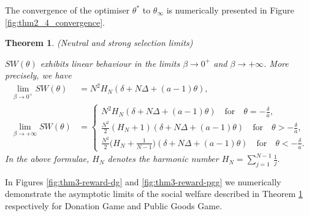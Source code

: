 \documentclass{article}
\newtheorem{theorem}{Theorem}
\begin{document}
The convergence of the optimiser $\theta^*$ to $\theta_\infty$ is numerically presented in Figure \ref{fig:thm2_4_convergence}.\\


\begin{theorem}(Neutral and strong selection limits) \label{thm: selection-limits}

$SW(\theta)$ exhibits linear behaviour in the limits $\beta \to 0^+$ and $\beta \to +\infty$. More precisely, we have
\begin{align*}
\lim_{\beta\to 0^+} SW(\theta)&=N^2 H_N (\delta+N\Delta+(a-1)\theta),\\
\lim_{\beta \to +\infty}SW(\theta)&=\begin{cases}
      N^2 H_N (\delta+N\Delta+(a-1)\theta)\quad\text{for}\quad \theta=-\frac{\delta}{a},\\
      \frac{N^2}{2}(H_N+1)(\delta+N\Delta+(a-1)\theta)\quad\text{for}\quad \theta>-\frac{\delta}{a},\\
      \frac{N^2}{2}\Big(H_N+\frac{1}{N-1}\Big) (\delta+N\Delta+(a-1)\theta)\quad\text{for}\quad \theta<-\frac{\delta}{a}.
    \end{cases}     
\end{align*}
In the above formulae, $H_N$ denotes the harmonic number $H_N=\sum_{j=1}^{N-1}\frac{1}{j}.$
\end{theorem}
In Figures \ref{fig:thm3-reward-dg} and \ref{fig:thm3-reward-pgg} we numerically demonstrate the asymptotic limits of the social welfare described in Theorem \ref{thm: selection-limits} respectively for Donation Game and Public Goods Game.
\end{document}
